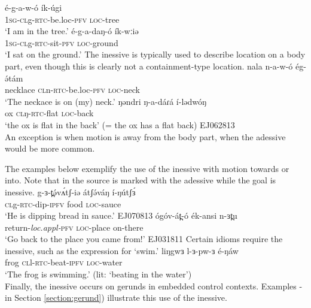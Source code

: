 \ea  
	\ea \gll 	é-g-a-w-ó 			ík-úgi \\
			\textsc{1sg-}\textsc{cl}g-\textsc{rtc-}be.loc-\textsc{pfv}	\textsc{loc-}tree\\
	\glt 	‘I am in the tree.’	 
\ex	\gll é-g-a-daŋ-ó ík-wːiə\\
			\textsc{1sg-}\textsc{cl}g-\textsc{rtc-}sit-\textsc{pfv} \textsc{loc-}ground \\
	\glt `I sat on the ground.'
	\z 
\z 
The inessive is typically used to describe location on a body part, even though this is clearly not a containment-type location. 
\ea 
\ea \gll 	nala		n-a-w-ó 			ég-ə́tám	\\
			necklace	\textsc{cl}n-\textsc{rtc-}be.loc-\textsc{pfv} 	\textsc{loc-}neck\\
	\glt 	‘The neckace is on (my) neck.’	 
\ex	\gll  ŋəndri ŋ-a-dáɾá í-lədwóŋ\\
			ox \textsc{cl}ŋ-\textsc{rtc-}flat \textsc{loc-}back\\
	\glt `the ox is flat in the back' (= the ox has a flat back)	\hfill EJ062813\\
\z 
\z 
An exception is when motion is away from the body part, when the adessive would be more common.

The examples below exemplify the use of the inessive with motion towards or into. Note that in  the source is marked with the adessive while the goal is inessive.
\ea \ea  \gll g-ɜ-t̪ə́vʌ́tʃ-iə átʃə́váŋ í-ŋútʃɜ́ \\
\textsc{cl}g-\textsc{rtc-}dip-\textsc{ipfv} food \textsc{loc-}sauce\\
\glt `He is dipping bread in sauce.'	\hfill EJ070813
\ex \gll ógóv-át̪-ó ék-ansi n-ɜt̪u\\
return-\textit{loc.appl-}\textsc{pfv} \textsc{loc-}place on-there\\
\glt `Go back to the place you came from!' \hfill EJ031811 \label{ex:ch6:to}
\z 
\z %
Certain idioms require the inessive, such as the expression for `swim.'
\ea 
\gll liŋgwɜ l-ɜ-pw-ɜ é-ŋáw\\
frog \textsc{cl}l-\textsc{rtc-}beat-\textsc{ipfv} \textsc{loc-}water\\
\glt  `The frog is swimming.' (lit: `beating in the water')\\
\z 
Finally, the inessive occurs on gerunds in embedded control contexts. Examples - in Section \ref{section:gerund}) illustrate this use of the inessive.


